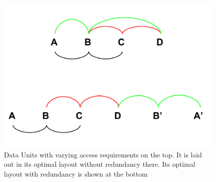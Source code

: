 \begin{figure}[ht]
\centering
\includegraphics[width=\columnwidth]{DataLayoutPaper_TheoryLayouts.pdf}
\caption{Data Units with varying access requirements on the top. It is laid out in its optimal layout without redundancy there. Its optimal layout with redundancy is shown at the bottom}
\label{fig:startingProb}
\end{figure}


